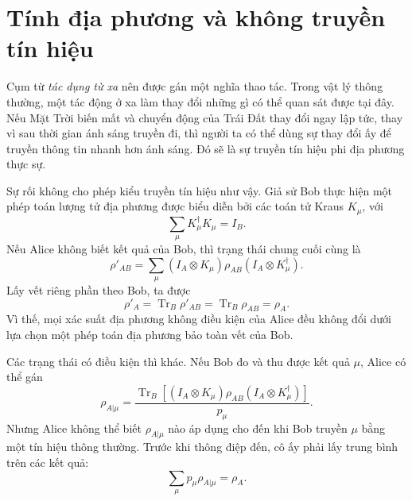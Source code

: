 \begin{classroomqa}
\end{classroomqa}

\section{Tính địa phương và không truyền tín hiệu}

Cụm từ \emph{tác dụng từ xa} nên được gán một nghĩa thao tác. Trong vật lý thông thường, một tác động ở xa làm thay đổi những gì có thể quan sát được tại đây. Nếu Mặt Trời biến mất và chuyển động của Trái Đất thay đổi ngay lập tức, thay vì sau thời gian ánh sáng truyền đi, thì người ta có thể dùng sự thay đổi ấy để truyền thông tin nhanh hơn ánh sáng. Đó sẽ là sự truyền tín hiệu phi địa phương thực sự.

Sự rối không cho phép kiểu truyền tín hiệu như vậy. Giả sử Bob thực hiện một phép toán lượng tử địa phương được biểu diễn bởi các toán tử Kraus \(K_\mu\), với
\begin{equation}
\sum_\mu K_\mu^\dagger K_\mu=I_B.
\end{equation}
Nếu Alice không biết kết quả của Bob, thì trạng thái chung cuối cùng là
\begin{equation}
\rho'_{AB}
=\sum_\mu
(I_A\otimes K_\mu)\rho_{AB}
(I_A\otimes K_\mu^\dagger).
\end{equation}
Lấy vết riêng phần theo Bob, ta được
\begin{equation}
\rho'_A
=\operatorname{Tr}_B\rho'_{AB}
=\operatorname{Tr}_B\rho_{AB}
=\rho_A.
\label{eq:l7-no-signaling}
\end{equation}
Vì thế, mọi xác suất địa phương không điều kiện của Alice đều không đổi dưới lựa chọn một phép toán địa phương bảo toàn vết của Bob.

Các trạng thái có điều kiện thì khác. Nếu Bob đo và thu được kết quả \(\mu\), Alice có thể gán
\begin{equation}
\rho_{A|\mu}
=\frac{
\operatorname{Tr}_B\!\left[
(I_A\otimes K_\mu)\rho_{AB}
(I_A\otimes K_\mu^\dagger)
\right]
}{p_\mu}.
\label{eq:l7-conditioned-state}
\end{equation}
Nhưng Alice không thể biết \(\rho_{A|\mu}\) nào áp dụng cho đến khi Bob truyền \(\mu\) bằng một tín hiệu thông thường. Trước khi thông điệp đến, cô ấy phải lấy trung bình trên các kết quả:
\begin{equation}
\sum_\mu p_\mu\rho_{A|\mu}=\rho_A.
\label{eq:l7-conditioned-average}
\end{equation}

